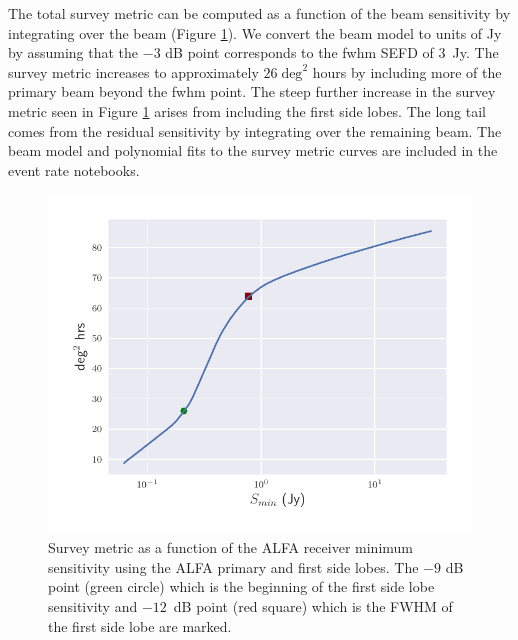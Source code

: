 \documentclass[a4paper,fleqn,usenatbib]{mnras}
\begin{document}
The total survey metric can be computed as a function of the beam sensitivity by
integrating over the beam (Figure \ref{fig:survey_metric_sense}). We convert the
beam model to units of Jy by assuming that the $-3$ dB point corresponds to the
\gls{fwhm} SEFD of 3~Jy. The survey metric increases to approximately $26 \;
\textrm{deg}^2$ hours by including more of the primary beam beyond the
\gls{fwhm} point. The steep further increase in the survey metric seen in Figure
\ref{fig:survey_metric_sense} arises from including the first side lobes. The
long tail comes from the residual sensitivity by integrating over the remaining
beam. The beam model and polynomial fits to the survey metric curves are
included in the event rate notebooks.

\begin{figure}
    \includegraphics[width=1.0\linewidth]{figures/full_survey_metric_sense.pdf}
    \caption{Survey metric as a function of the ALFA receiver minimum
    sensitivity using the ALFA primary and first side lobes. The $-9$ dB point
    (green circle) which is the beginning of the first side lobe sensitivity and
    $-12$~dB point (red square) which is the FWHM of the first side lobe are
    marked.
    }
    \label{fig:survey_metric_sense}
\end{figure}
\end{document}
